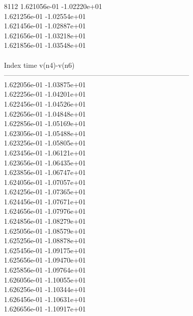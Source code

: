 8112	1.621056e-01	-1.02220e+01	\\ 	1.621256e-01	-1.02554e+01	\\ 	1.621456e-01	-1.02887e+01	\\ 	1.621656e-01	-1.03218e+01	\\ 	1.621856e-01	-1.03548e+01	\\ \hline
\\ \hline
Index   time            v(n4)-v(n6)     \\ \hline
--------------------------------------------------------------------------------\\ 	1.622056e-01	-1.03875e+01	\\ 	1.622256e-01	-1.04201e+01	\\ 	1.622456e-01	-1.04526e+01	\\ 	1.622656e-01	-1.04848e+01	\\ 	1.622856e-01	-1.05169e+01	\\ 	1.623056e-01	-1.05488e+01	\\ 	1.623256e-01	-1.05805e+01	\\ 	1.623456e-01	-1.06121e+01	\\ 	1.623656e-01	-1.06435e+01	\\ 	1.623856e-01	-1.06747e+01	\\ 	1.624056e-01	-1.07057e+01	\\ 	1.624256e-01	-1.07365e+01	\\ 	1.624456e-01	-1.07671e+01	\\ 	1.624656e-01	-1.07976e+01	\\ 	1.624856e-01	-1.08279e+01	\\ 	1.625056e-01	-1.08579e+01	\\ 	1.625256e-01	-1.08878e+01	\\ 	1.625456e-01	-1.09175e+01	\\ 	1.625656e-01	-1.09470e+01	\\ 	1.625856e-01	-1.09764e+01	\\ 	1.626056e-01	-1.10055e+01	\\ 	1.626256e-01	-1.10344e+01	\\ 	1.626456e-01	-1.10631e+01	\\ 	1.626656e-01	-1.10917e+01	\\ \hline
